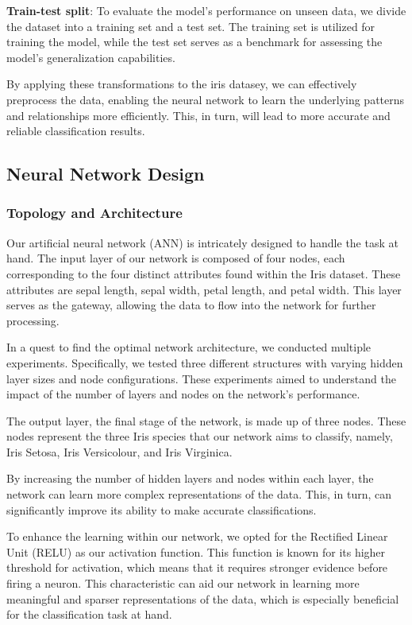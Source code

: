 \documentclass[conference]{inc/IEEEtran}
\begin{document}
\textbf{Train-test split}: To evaluate the model's performance on unseen data, we divide the dataset into a training set and a
    test set. The training set is utilized for training the model, while the test set serves as a benchmark for assessing the
    model's generalization capabilities.

By applying these transformations to the iris datasey, we can effectively preprocess the data, enabling the neural
network to learn the underlying patterns and relationships more efficiently. This, in turn, will lead to more accurate and
reliable classification results.

\subsection{Neural Network Design}

\subsubsection{Topology and Architecture}

Our artificial neural network (ANN) is intricately designed to handle the task at hand. The input layer of our network is composed of four nodes, each corresponding to the four distinct attributes found within the Iris dataset. These attributes are sepal length, sepal width, petal length, and petal width. This layer serves as the gateway, allowing the data to flow into the network for further processing.

In a quest to find the optimal network architecture, we conducted multiple experiments. Specifically, we tested three different structures with varying hidden layer sizes and node configurations. These experiments aimed to understand the impact of the number of layers and nodes on the network's performance.

The output layer, the final stage of the network, is made up of three nodes. These nodes represent the three Iris species that our network aims to classify, namely, Iris Setosa, Iris Versicolour, and Iris Virginica.

By increasing the number of hidden layers and nodes within each layer, the network can learn more complex representations of the data. This, in turn, can significantly improve its ability to make accurate classifications. 

To enhance the learning within our network, we opted for the Rectified Linear Unit (RELU) as our activation function. This function is known for its higher threshold for activation, which means that it requires stronger evidence before firing a neuron. This characteristic can aid our network in learning more meaningful and sparser representations of the data, which is especially beneficial for the classification task at hand.
\end{document}
